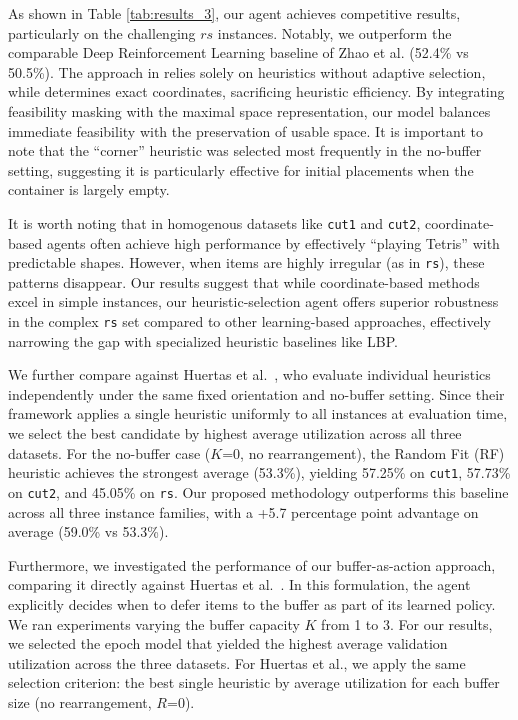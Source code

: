 \documentclass[runningheads]{llncs}
\begin{document}
As shown in Table \ref{tab:results_3}, our agent achieves competitive results, particularly on the challenging $rs$ instances. Notably, we outperform the comparable Deep Reinforcement Learning baseline of Zhao et al. \cite{zhao} (52.4\% vs 50.5\%). The approach in \cite{david} relies solely on heuristics without adaptive selection, while \cite{zhao} determines exact coordinates, sacrificing heuristic efficiency. By integrating feasibility masking with the maximal space representation, our model balances immediate feasibility with the preservation of usable space. It is important to note that the ``corner'' heuristic was selected most frequently in the no-buffer setting, suggesting it is particularly effective for initial placements when the container is largely empty.

It is worth noting that in homogenous datasets like \texttt{cut1} and \texttt{cut2}, coordinate-based agents often achieve high performance by effectively ``playing Tetris'' with predictable shapes. However, when items are highly irregular (as in \texttt{rs}), these patterns disappear. Our results suggest that while coordinate-based methods excel in simple instances, our heuristic-selection agent offers superior robustness in the complex \texttt{rs} set compared to other learning-based approaches, effectively narrowing the gap with specialized heuristic baselines like LBP.

We further compare against Huertas et al.~\cite{huertas}, who evaluate individual heuristics independently under the same fixed orientation and no-buffer setting. Since their framework applies a single heuristic uniformly to all instances at evaluation time, we select the best candidate by highest average utilization across all three datasets. For the no-buffer case ($K$=0, no rearrangement), the Random Fit (RF) heuristic achieves the strongest average (53.3\%), yielding 57.25\% on \texttt{cut1}, 57.73\% on \texttt{cut2}, and 45.05\% on \texttt{rs}. Our proposed methodology outperforms this baseline across all three instance families, with a +5.7 percentage point advantage on average (59.0\% vs 53.3\%).

Furthermore, we investigated the performance of our buffer-as-action approach, comparing it directly against Huertas et al.~\cite{huertas}. In this formulation, the agent explicitly decides when to defer items to the buffer as part of its learned policy. We ran experiments varying the buffer capacity $K$ from 1 to 3. For our results, we selected the epoch model that yielded the highest average validation utilization across the three datasets. For Huertas et al., we apply the same selection criterion: the best single heuristic by average utilization for each buffer size (no rearrangement, $R$=0).
\end{document}
